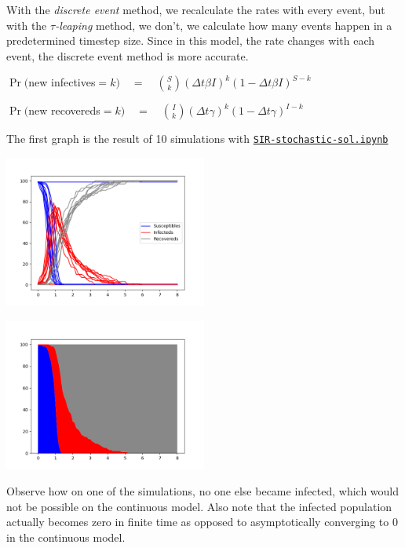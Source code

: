 \begin{solution}
\begin{slide}
\begin{parts}
	\item With the \textit{discrete event} method, we recalculate the rates with every event, but with the \textit{$\tau$-leaping} method, we don't, we calculate how many events happen in a predetermined timestep size. Since in this model, the rate changes with each event, the discrete event method is more accurate.

	\item 

		$\Pr($new infectives$=k)\quad =\quad {{S}\choose{k}} (\Delta t \beta I)^k (1-\Delta t \beta I)^{S-k}$
		
		$\Pr($new recovereds$=k)\quad =\quad {{I}\choose{k}} (\Delta t \gamma)^k (1-\Delta t \gamma)^{I-k}$

		
	\item The first graph is the result of 10 simulations with \href{https://utoronto.syzygy.ca/jupyter/user-redirect/git-pull?repo=https://github.com/bigfatbernie/IBLMathModeling&subPath=book/python/SIR-stochastic-sol.ipynb}{\tt SIR-stochastic-sol.ipynb}
	
	\includegraphics[width=0.5\textwidth]{images/SIR-stochastic1.png}

	\includegraphics[width=0.5\textwidth]{images/SIR-stochastic2.png}
	
	\item Observe how on one of the simulations, no one else became infected, which would not be possible on the continuous model. Also note that the infected population actually becomes zero in finite time as opposed to asymptotically converging to 0 in the continuous model.
\end{parts}
	
\end{slide}
	
\end{solution}



